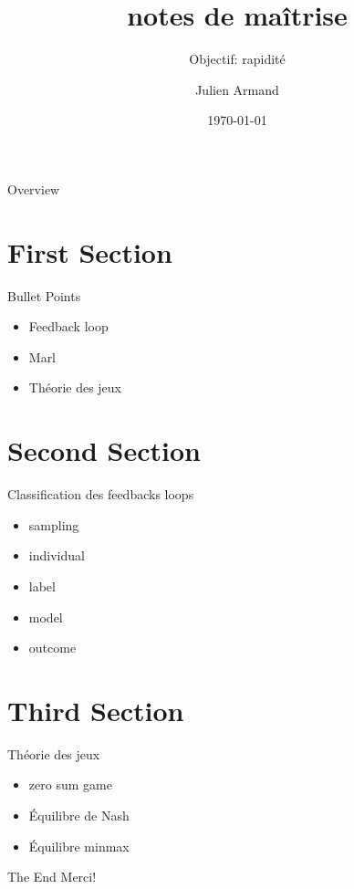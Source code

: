 \documentclass[aspectratio=169, xcolor=dvipsnames]{beamer}
\title{notes de maîtrise}
\subtitle{Objectif: rapidité}
\author{Julien Armand}
\institute{Université Laval}
\date{\today}
\begin{document}
\begin{frame}
    \titlepage
\end{frame}

\begin{frame}{Overview}
    \tableofcontents
\end{frame}

\section{First Section}

\begin{frame}{Bullet Points}
    \begin{itemize}
        \item Feedback loop 
        \item Marl
        \item Théorie des jeux
    \end{itemize}
\end{frame}

\section{Second Section}

\begin{frame}{Classification des feedbacks loops}
    \begin{itemize}
        \item sampling
        \item individual
        \item label
        \item model
        \item outcome
    \end{itemize}
\end{frame}

\section{Third Section}

\begin{frame}{Théorie des jeux}
    \begin{itemize}
        \item zero sum game
        \item Équilibre de Nash
        \item Équilibre minmax
    \end{itemize}
\end{frame}

\begin{frame}{The End}
    \centering
    \Huge{Merci!}
\end{frame}
\end{document}
